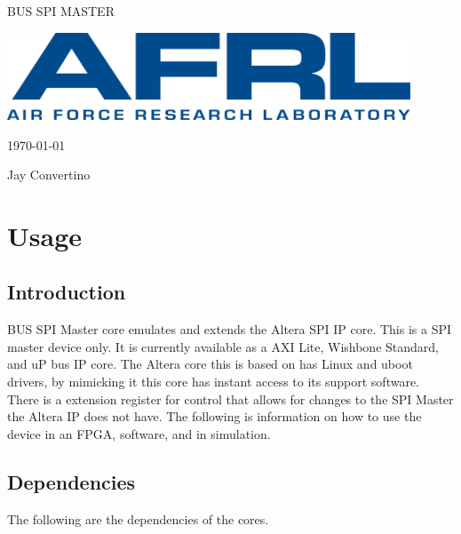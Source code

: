 \begin{titlepage}
  \begin{center}

  {\Huge BUS SPI MASTER}

  \vspace{25mm}

  \includegraphics[width=0.90\textwidth,height=\textheight,keepaspectratio]{img/AFRL.png}

  \vspace{25mm}

  \today

  \vspace{15mm}

  {\Large Jay Convertino}

  \end{center}
\end{titlepage}

\tableofcontents

\newpage

\section{Usage}

\subsection{Introduction}

\par
BUS SPI Master core emulates and extends the Altera SPI IP core. This is a SPI master device only. It is
currently available as a AXI Lite, Wishbone Standard, and uP bus IP core. The Altera core this is based on has Linux
and uboot drivers, by mimicking it this core has instant access to its support software. There is a extension register for control
that allows for changes to the SPI Master the Altera IP does not have. The following is information on how to use the
device in an FPGA, software, and in simulation.

\subsection{Dependencies}

\par
The following are the dependencies of the cores.

